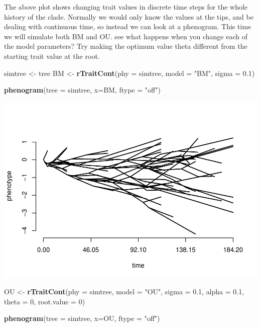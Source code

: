 \documentclass[]{article}
\newenvironment{Shaded}{\begin{snugshade}}{\end{snugshade}}
\newcommand{\KeywordTok}[1]{\textcolor[rgb]{0.13,0.29,0.53}{\textbf{#1}}}
\newcommand{\DataTypeTok}[1]{\textcolor[rgb]{0.13,0.29,0.53}{#1}}
\newcommand{\DecValTok}[1]{\textcolor[rgb]{0.00,0.00,0.81}{#1}}
\newcommand{\FloatTok}[1]{\textcolor[rgb]{0.00,0.00,0.81}{#1}}
\newcommand{\StringTok}[1]{\textcolor[rgb]{0.31,0.60,0.02}{#1}}
\newcommand{\NormalTok}[1]{#1}
\begin{document}
The above plot shows changing trait values in discrete time steps for
the whole history of the clade. Normally we would only know the values
at the tips, and be dealing with continuous time, so instead we can look
at a phenogram. This time we will simulate both BM and OU. see what
happens when you change each of the model parameters? Try making the
optimum value theta different from the starting trait value at the root.

\begin{Shaded}
\begin{Highlighting}[]
\NormalTok{simtree <-}\StringTok{ }\NormalTok{tree}
\NormalTok{BM <-}\StringTok{ }\KeywordTok{rTraitCont}\NormalTok{(}\DataTypeTok{phy =}\NormalTok{ simtree,}
                 \DataTypeTok{model =} \StringTok{"BM"}\NormalTok{,}
                 \DataTypeTok{sigma =} \FloatTok{0.1}\NormalTok{)}

\KeywordTok{phenogram}\NormalTok{(}\DataTypeTok{tree =}\NormalTok{ simtree,}
          \DataTypeTok{x=}\NormalTok{BM,}
          \DataTypeTok{ftype =} \StringTok{"off"}\NormalTok{)}
\end{Highlighting}
\end{Shaded}

\includegraphics{module_08_files/figure-latex/unnamed-chunk-18-1.pdf}

\begin{Shaded}
\begin{Highlighting}[]
\NormalTok{OU <-}\StringTok{ }\KeywordTok{rTraitCont}\NormalTok{(}\DataTypeTok{phy =}\NormalTok{ simtree,}
                 \DataTypeTok{model =} \StringTok{"OU"}\NormalTok{,}
                 \DataTypeTok{sigma =} \FloatTok{0.1}\NormalTok{,}
                 \DataTypeTok{alpha =} \FloatTok{0.1}\NormalTok{,}
                 \DataTypeTok{theta =} \DecValTok{0}\NormalTok{,}
                 \DataTypeTok{root.value =} \DecValTok{0}\NormalTok{)}

\KeywordTok{phenogram}\NormalTok{(}\DataTypeTok{tree =}\NormalTok{ simtree,}
          \DataTypeTok{x=}\NormalTok{OU,}
          \DataTypeTok{ftype =} \StringTok{"off"}\NormalTok{)}
\end{Highlighting}
\end{Shaded}
\end{document}
